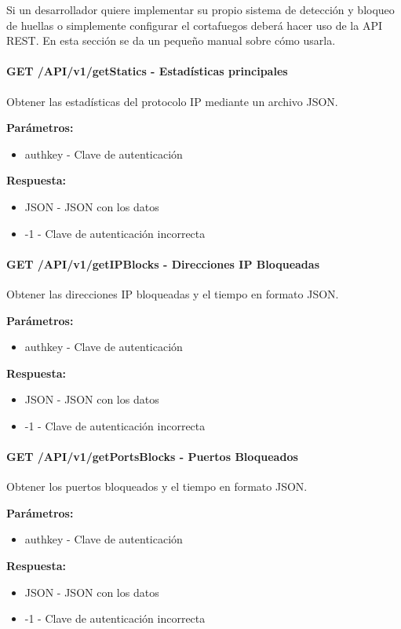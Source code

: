 Si un desarrollador quiere implementar su propio sistema de detección y bloqueo de huellas o simplemente configurar el cortafuegos deberá hacer uso de la API REST. En esta sección se da un pequeño manual sobre cómo usarla.

\paragraph{\textbf{GET} /API/v1/getStatics - Estadísticas principales}

Obtener las estadísticas del protocolo IP mediante un archivo JSON.

\textbf{Parámetros:}

\begin{itemize}
\item authkey - Clave de autenticación
\end{itemize}
\textbf{Respuesta:}
\begin{itemize}
\item JSON - JSON con los datos
\item -1 - Clave de autenticación incorrecta
\end{itemize}
\paragraph{\textbf{GET} /API/v1/getIPBlocks - Direcciones IP Bloqueadas}
Obtener las direcciones IP bloqueadas y el tiempo en formato JSON.

\textbf{Parámetros:}

\begin{itemize}
\item authkey - Clave de autenticación
\end{itemize}
\textbf{Respuesta:}
\begin{itemize}
\item JSON - JSON con los datos
\item -1 - Clave de autenticación incorrecta
\end{itemize}

\paragraph{\textbf{GET} /API/v1/getPortsBlocks - Puertos Bloqueados}
Obtener los puertos bloqueados y el tiempo en formato JSON.

\textbf{Parámetros:}

\begin{itemize}
\item authkey - Clave de autenticación
\end{itemize}
\textbf{Respuesta:}
\begin{itemize}
\item JSON - JSON con los datos
\item -1 - Clave de autenticación incorrecta
\end{itemize}
